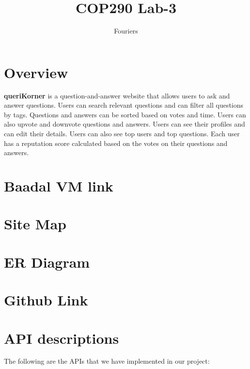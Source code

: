 \documentclass{article}
\title{COP290 Lab-3}
\author{Fouriers}
\date{}
\begin{document}
\maketitle


\section{Overview}
\textbf{queriKorner} is a question-and-answer website that allows users to ask and answer questions.
Users can search relevant questions and can filter all questions by tags.
Questions and answers can be sorted based on votes and time.
Users can also upvote and downvote questions and answers.
Users can see their profiles and can edit their details.
Users can also see top users and top questions.
Each user has a reputation score calculated based on the votes on their questions and answers.
\section{Baadal VM link}
\section{Site Map}

\section{ER Diagram}

\section{Github Link}

\section{API descriptions}


The following are the APIs that we have implemented in our project:
\end{document}
